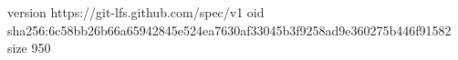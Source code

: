 version https://git-lfs.github.com/spec/v1
oid sha256:6c58bb26b66a65942845e524ea7630af33045b3f9258ad9e360275b446f91582
size 950
